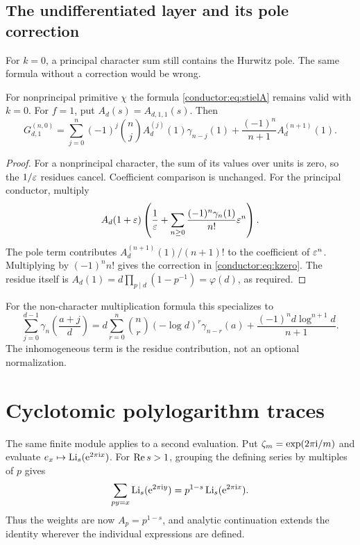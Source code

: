 \subsection{The undifferentiated layer and its pole correction}

For $k=0$, a principal character sum still contains the Hurwitz pole.
The same formula without a correction would be wrong.

\begin{proposition}[The $k=0$ correction]\label{conductor:prop:kzero}
For nonprincipal primitive $\chi$ the formula
\eqref{conductor:eq:stielA} remains valid with $k=0$. For $f=1$, put
$A_d(s)=A_{d,1,1}(s)$. Then
\begin{equation}\label{conductor:eq:kzero}
G_{d,1}^{(n,0)}=
\sum_{j=0}^{n}(-1)^j\binom nj A_d^{(j)}(1)\gamma_{n-j}(1)
+\frac{(-1)^n}{n+1}A_d^{(n+1)}(1).
\end{equation}
\end{proposition}
\begin{proof}
For a nonprincipal character, the sum of its values over units is zero,
so the $1/\varepsilon$ residues cancel. Coefficient comparison is unchanged.
For the principal conductor, multiply
\[
A_d(1+\varepsilon)\left(\frac1{\varepsilon}+
\sum_{n\ge0}\frac{(-1)^n\gamma_n(1)}{n!}\varepsilon^n\right).
\]
The pole term contributes $A_d^{(n+1)}(1)/(n+1)!$ to the coefficient of
$\varepsilon^n$. Multiplying by $(-1)^n n!$ gives the correction in
\eqref{conductor:eq:kzero}. The residue itself is
$A_d(1)=d\prod_{p\mid d}(1-p^{-1})=\varphi(d)$, as required.
\end{proof}

For the non-character multiplication formula this specializes to
\begin{equation}\label{conductor:eq:classicalstieldist}
\sum_{j=0}^{d-1}\gamma_n\!\left(\frac{a+j}{d}\right)
=d\sum_{r=0}^{n}\binom nr(-\log d)^r\gamma_{n-r}(a)
+\frac{(-1)^n d\log^{n+1}d}{n+1}.
\end{equation}
The inhomogeneous term is the residue contribution, not an optional
normalization.


\section{Cyclotomic polylogarithm traces}\label{jets:sec:traces}

The same finite module applies to a second evaluation. Put
$\zeta_m=\exp(2\pi\mathrm{i}/m)$ and evaluate
$e_x\mapsto\operatorname{Li}_s(\mathrm e^{2\pi\mathrm{i} x})$.
For $\operatorname{Re} s>1$, grouping the defining series by multiples of $p$ gives
\[
 \sum_{py=x}\operatorname{Li}_s(\mathrm e^{2\pi\mathrm{i} y})
 =p^{1-s}\operatorname{Li}_s(\mathrm e^{2\pi\mathrm{i} x}).
\]
Thus the weights are now $A_p=p^{1-s}$, and analytic continuation
extends the identity wherever the individual expressions are defined.

